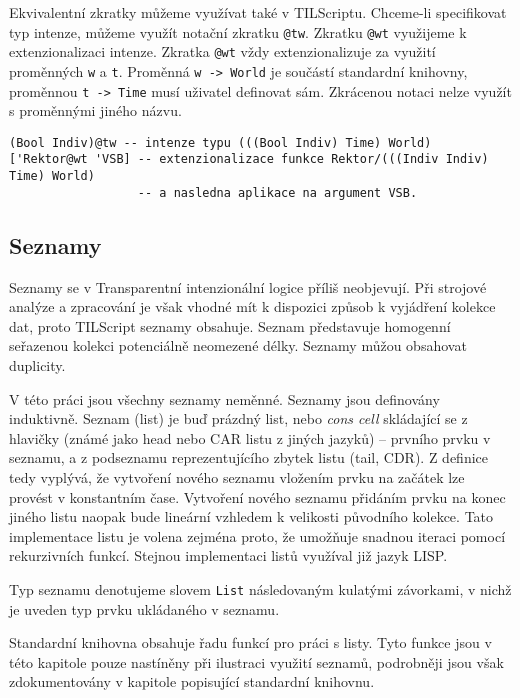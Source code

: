 Ekvivalentní zkratky můžeme využívat také v TILScriptu. Chceme-li specifikovat typ intenze, můžeme
využít notační zkratku \lstinline{@tw}. Zkratku \lstinline{@wt} využijeme k extenzionalizaci
intenze. Zkratka \lstinline{@wt} vždy extenzionalizuje za využití proměnných \lstinline{w} a
\lstinline{t}. Proměnná \lstinline{w -> World} je součástí standardní knihovny, proměnnou
\lstinline{t -> Time} musí uživatel definovat sám. Zkrácenou notaci nelze využít s proměnnými
jiného názvu.

\begin{lstlisting}[caption={Příklad využití zkrácené notace}]
(Bool Indiv)@tw -- intenze typu (((Bool Indiv) Time) World)
['Rektor@wt 'VSB] -- extenzionalizace funkce Rektor/(((Indiv Indiv) Time) World)
                  -- a nasledna aplikace na argument VSB.
\end{lstlisting}

\subsection{Seznamy}

Seznamy se v Transparentní intenzionální logice příliš neobjevují. Při strojové analýze a
zpracování je však vhodné mít k dispozici způsob k vyjádření kolekce dat, proto TILScript seznamy
obsahuje. Seznam představuje homogenní seřazenou kolekci potenciálně neomezené délky. Seznamy můžou
obsahovat duplicity.

V této práci jsou všechny seznamy neměnné. Seznamy jsou definovány induktivně. Seznam (list) je buď
prázdný list, nebo \textit{cons cell} skládající se z hlavičky (známé jako head nebo CAR listu
z jiných jazyků) -- prvního prvku v seznamu, a z podseznamu reprezentujícího zbytek listu
(tail, CDR). Z definice tedy vyplývá, že vytvoření nového seznamu vložením prvku na začátek lze
provést v konstantním čase. Vytvoření nového seznamu přidáním prvku na konec jiného listu naopak
bude lineární vzhledem k velikosti původního kolekce. Tato implementace listu je volena zejména
proto, že umožňuje snadnou iteraci pomocí rekurzivních funkcí. Stejnou implementaci listů využíval
již jazyk LISP.

Typ seznamu denotujeme slovem \lstinline{List} následovaným kulatými závorkami, v nichž je uveden
typ prvku ukládaného v seznamu.

Standardní knihovna obsahuje řadu funkcí pro práci s listy. Tyto funkce jsou v této kapitole pouze
nastíněny při ilustraci využití seznamů, podrobněji jsou však zdokumentovány v kapitole popisující
standardní knihovnu.

